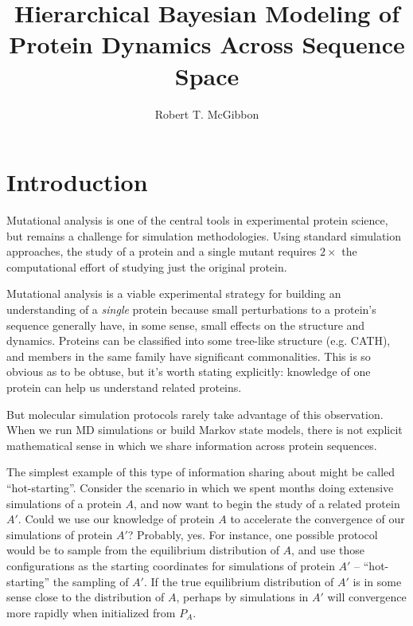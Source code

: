 \documentclass[twocolumn,floatfix,nofootinbib,aps]{revtex4-1}
\begin{document}
\title{Hierarchical Bayesian Modeling of Protein Dynamics Across Sequence Space}
\author{Robert T. McGibbon}

\begin{abstract}
\end{abstract}
\maketitle

\section{Introduction}
Mutational analysis is one of the central tools in experimental protein science, but remains a challenge for simulation methodologies. Using standard simulation approaches, the study of a protein and a single mutant requires $2\times$ the computational effort of studying just the original protein.

Mutational analysis is a viable experimental strategy for building an understanding of a \emph{single} protein because small perturbations to a protein's sequence generally have, in some sense, small effects on the structure and dynamics. Proteins can be classified into some tree-like structure (e.g. CATH), and members in the same family have significant commonalities. This is so obvious as to be obtuse, but it's worth stating explicitly: knowledge of one protein can help us understand related proteins.

But molecular simulation protocols rarely take advantage of this observation. When we run MD simulations or build Markov state models, there is not explicit mathematical sense in which we share information across protein sequences.

The simplest example of this type of information sharing about might be called ``hot-starting''. Consider the scenario in which we spent months doing extensive simulations of a protein $A$, and now want to begin the study of a related protein $A'$. Could we use our knowledge of protein $A$ to accelerate the convergence of our simulations of protein $A'$? Probably, yes. For instance, one possible protocol would be to sample from the equilibrium distribution of $A$, and use those configurations as the starting coordinates for simulations of protein $A'$ -- ``hot-starting'' the sampling of $A'$. If the true equilibrium distribution of $A'$ is in some sense close to the distribution of $A$, perhaps by simulations in $A'$ will convergence more rapidly when initialized from $P_A$.
\end{document}
